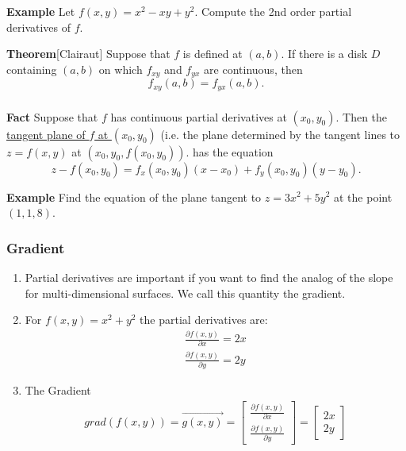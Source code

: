 \begin{frame}[fragile]\frametitle{}
\textbf{Example}
 Let $f(x,y) = x^2 -xy +y^2$.  Compute the 2nd order partial derivatives of $f$.
  

\textbf{Theorem}[Clairaut]
 Suppose that $f$ is defined at $(a,b)$.  If there is a disk $D$ containing $(a,b)$ on which $f_{xy}$ and $f_{yx}$ are continuous, then 
 $$f_{xy}(a,b)=f_{yx}(a,b).$$

\end{frame}



\begin{frame}[fragile]\frametitle{}
 \textbf{Fact}
   Suppose that $f$ has continuous partial derivatives at $(x_0,y_0)$.  Then the \underline{tangent plane of $f$ at $(x_0,y_0)$} (i.e. the plane determined by the tangent lines to $z=f(x,y)$ at $(x_0,y_0,f(x_0,y_0))$. has the equation
   $$
     z-f(x_0,y_0) = f_x(x_0,y_0)(x-x_0) + f_y(x_0,y_0)(y-y_0).
   $$
  

\textbf{Example}
  Find the equation of the plane tangent to $z=3x^2+5y^2$ at the point $(1,1,8)$.

\end{frame}


 \begin{frame}[fragile] \frametitle{Gradient}

\begin{enumerate}
  \item Partial derivatives are important if you want to find the analog of the slope for multi-dimensional surfaces. We call this quantity the gradient.
 \item For $f(x,y) = x^2 + y^2$ the partial derivatives are:
 \begin{align}
 \frac{\partial f(x,y)}{\partial x} = 2x \\
\frac{\partial f(x,y)}{\partial y} = 2y
\end{align}
\item The Gradient
\begin{eqnarray*}
grad(f(x,y)) =  \vec{g(x,y)} = \begin{bmatrix}\frac{\partial f(x,y)}{\partial x} \\ \frac{\partial f(x,y)}{\partial y} \end{bmatrix} = \begin{bmatrix}2x \\ 2y \end{bmatrix}
\end{eqnarray*}

\end{enumerate}
 

\end{frame}

